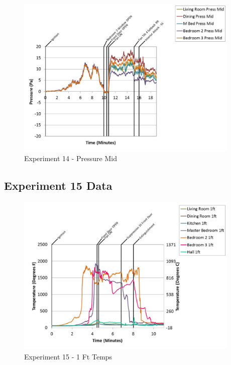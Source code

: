\documentclass{article}
\begin{document}
\begin{appendices}
	\begin{figure}[h!]
		\centering
		\includegraphics[height=3.05in]{0_Images/Results_Charts/Exp_14_Charts/PressureMid.pdf}
		\caption{Experiment 14 - Pressure Mid}
	\end{figure}
 
	\clearpage

		\clearpage
\clearpage		\large
\subsection{Experiment 15 Data} \label{App:Exp15Results} 

	\begin{figure}[h!]
		\centering
		\includegraphics[height=3.05in]{0_Images/Results_Charts/Exp_15_Charts/1FtTemps.pdf}
		\caption{Experiment 15 - 1 Ft Temps}
	\end{figure}
 


\end{appendices}
\end{document}
